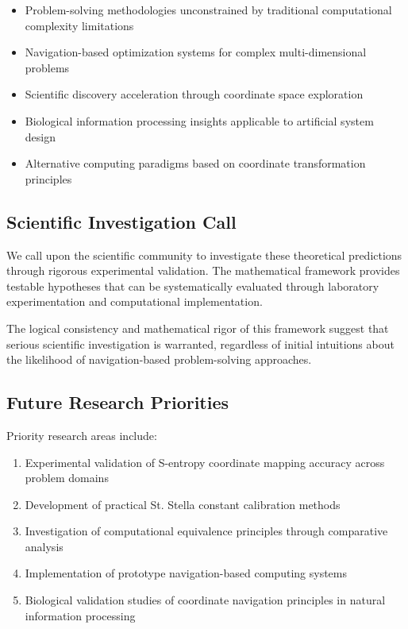 \documentclass[12pt,a4paper]{article}
\begin{document}
\begin{itemize}
\item Problem-solving methodologies unconstrained by traditional computational complexity limitations
\item Navigation-based optimization systems for complex multi-dimensional problems
\item Scientific discovery acceleration through coordinate space exploration
\item Biological information processing insights applicable to artificial system design
\item Alternative computing paradigms based on coordinate transformation principles
\end{itemize}

\subsection{Scientific Investigation Call}

We call upon the scientific community to investigate these theoretical predictions through rigorous experimental validation. The mathematical framework provides testable hypotheses that can be systematically evaluated through laboratory experimentation and computational implementation.

The logical consistency and mathematical rigor of this framework suggest that serious scientific investigation is warranted, regardless of initial intuitions about the likelihood of navigation-based problem-solving approaches.

\subsection{Future Research Priorities}

Priority research areas include:

\begin{enumerate}
\item Experimental validation of S-entropy coordinate mapping accuracy across problem domains
\item Development of practical St. Stella constant calibration methods
\item Investigation of computational equivalence principles through comparative analysis
\item Implementation of prototype navigation-based computing systems
\item Biological validation studies of coordinate navigation principles in natural information processing
\end{enumerate}
\end{document}
